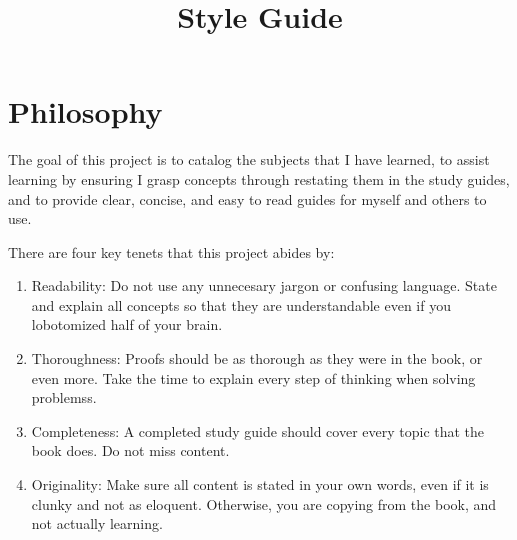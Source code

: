\documentclass{article}
\title{Style Guide}
\begin{document}
\maketitle

\section{Philosophy}

The goal of this project is to catalog the subjects that I have learned, to assist learning by ensuring I grasp concepts through restating them in the study guides, and to provide clear, concise, and easy to read guides for myself and others to use.

There are four key tenets that this project abides by:

\begin{enumerate}
    \item Readability: Do not use any unnecesary jargon or confusing language. State and explain all concepts so that they are understandable even if you lobotomized half of your brain.
    \item Thoroughness: Proofs should be as thorough as they were in the book, or even more. Take the time to explain every step of thinking when solving problemss.
    \item Completeness: A completed study guide should cover every topic that the book does. Do not miss content.
    \item Originality: Make sure all content is stated in your own words, even if it is clunky and not as eloquent. Otherwise, you are copying from the book, and not actually learning.
\end{enumerate}
\end{document}
